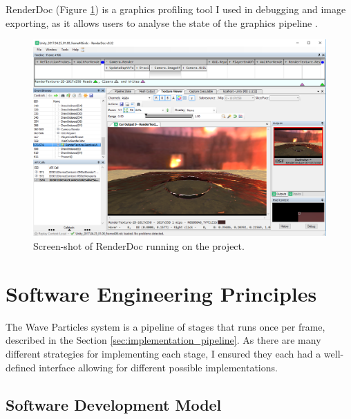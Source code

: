 \documentclass[12pt,a4paper,twoside]{report}
\begin{document}
RenderDoc (Figure \ref{fig:renderdoc}) is a graphics profiling tool I used in
debugging and image exporting, as it allows users to analyse the state of the
graphics pipeline \cite{RenderDoc}.

\begin{figure}[h]
\centering
\includegraphics[width=0.8\linewidth]{renderdoc}
\caption{Screen-shot of RenderDoc running on the project.}
\label{fig:renderdoc}
\end{figure}


\section{Software Engineering Principles}







The Wave Particles system is a pipeline of stages that runs once per frame,
described in the Section \ref{sec:implementation_pipeline}. As there are many
different strategies for implementing each stage, I ensured they each had a
well-defined interface allowing for different possible implementations.

\subsection{Software Development Model}
\end{document}
